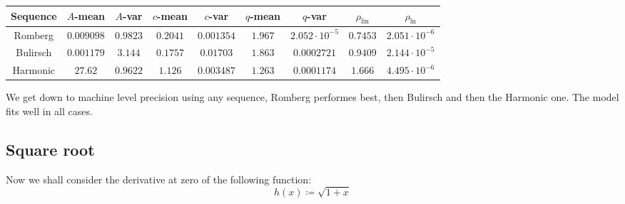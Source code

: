 \begin{table}[H]
    \centering
    \small
    \begin{tabular}{c||c|c|c|c|c|c|c|c}
Sequence & \(A\)-mean & \(A\)-var & \(c\)-mean & \(c\)-var & \(q\)-mean & \(q\)-var & \(\rho_{\operatorname{lin}}\) & \(\rho_{\ln}\)\\\hline
\rowcolor{green}
Romberg & \(0.009098\) & \(0.9823\) & \(0.2041\) & \(0.001354\) & \(1.967\) & \(2.052\cdot 10^{-5}\) & \(0.7453\) & \(2.051\cdot 10^{-6}\) \\
\rowcolor{green}
Bulirsch & \(0.001179\) & \(3.144\) & \(0.1757\) & \(0.01703\) & \(1.863\) & \(0.0002721\) & \(0.9409\) & \(2.144\cdot 10^{-5}\) \\
\rowcolor{green}
Harmonic & \(27.62\) & \(0.9622\) & \(1.126\) & \(0.003487\) & \(1.263\) & \(0.0001174\) & \(1.666\) & \(4.495\cdot 10^{-6}\) \\
    \end{tabular}
    \label{tab:my_label}
\end{table}

We get down to machine level precision using any sequence, Romberg performes best, then Bulirsch and then the Harmonic one. The model fits well in all cases.

\subsection{Square root}

Now we shall consider the derivative at zero of the following function:
\[
h(x) \coloneqq \sqrt{1 + x}
\]

